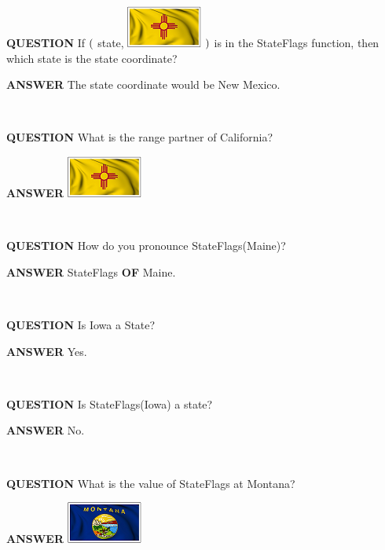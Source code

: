 \documentclass{ximera}
\begin{document}
\begin{dialogue}
\item [\textbf{QUESTION}] If  $\Large{(}$ state, \includegraphics{pics/StateFlags/NewMexico.png} $\Large{)}$  is in the StateFlags function, then which state is the state coordinate?
\item [\textbf{ANSWER}]  The state coordinate would be New Mexico.
\end{dialogue}
\quad \\

\begin{dialogue}
\item [\textbf{QUESTION}] What is the range partner of California?
\item [\textbf{ANSWER}] \includegraphics{pics/StateFlags/NewMexico.png}
\end{dialogue}
\quad \\

\begin{dialogue}
\item [\textbf{QUESTION}] How do you pronounce StateFlags(Maine)?
\item [\textbf{ANSWER}]   StateFlags \textbf{OF} Maine.
\end{dialogue}
\quad \\

\begin{dialogue}
\item [\textbf{QUESTION}] Is Iowa a State?
\item [\textbf{ANSWER}]    Yes.
\end{dialogue}
\quad \\

\begin{dialogue}
\item [\textbf{QUESTION}] Is StateFlags(Iowa) a state?
\item [\textbf{ANSWER}]    No.
\end{dialogue}
\quad \\

\begin{dialogue}
\item [\textbf{QUESTION}] What is the value of StateFlags at Montana?
\item [\textbf{ANSWER}] \includegraphics{pics/StateFlags/Montana.png}
\end{dialogue}
\quad \\
\end{document}
